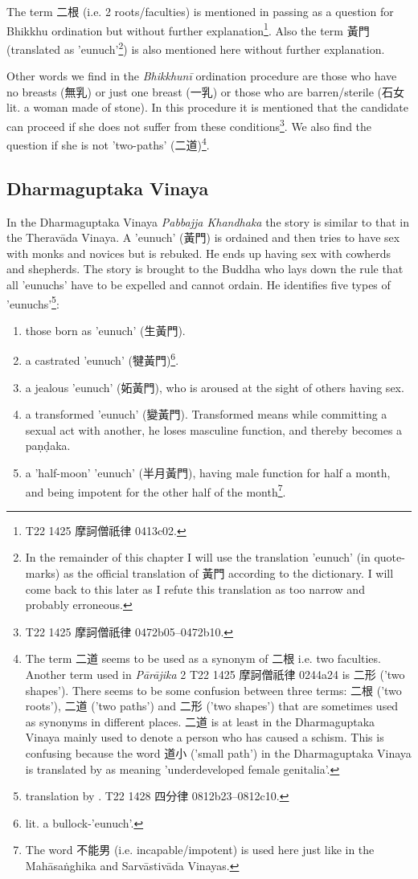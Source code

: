The term 二根 (i.e. 2 roots/faculties) is mentioned in passing as a question for Bhikkhu ordination but without further explanation\footnote{T22 1425 摩訶僧祇律 0413c02.}. Also the term 黃門 (translated as 'eunuch'\footnote{In the remainder of this chapter I will use the translation 'eunuch' (in quote-marks) as the official translation of 黃門 according to the dictionary. I will come back to this later as I refute this translation as too narrow and probably erroneous.}) is also mentioned here without further explanation.

Other words we find in the {\em Bhikkhunī} ordination procedure are those who have no breasts (無乳) or just one breast (一乳) or those who are barren/sterile (石女 lit. a woman made of stone). In this procedure it is mentioned that the candidate can proceed if she does not suffer from these conditions\footnote{T22 1425 摩訶僧祇律 0472b05–0472b10.}. We also find the question if she is not ’two-paths’ (二道)\footnote{The term 二道 seems to be used as a synonym of 二根 i.e. two faculties. Another term used in {\em Pārājika} 2 T22 1425 摩訶僧祇律 0244a24 is 二形 ('two shapes'). There seems to be some confusion between three terms: 二根 ('two roots'), 二道 ('two paths') and 二形 ('two shapes') that are sometimes used as synonyms in different places. 二道 is at least in the Dharmaguptaka Vinaya mainly used to denote a person who has caused a schism. This is confusing because the word 道小 ('small path') in the Dharmaguptaka Vinaya is translated by \cite{bodhi} as meaning 'underdeveloped female genitalia'.}.

\subsection{Dharmaguptaka Vinaya}
In the Dharmaguptaka Vinaya {\em Pabbajja Khandhaka} the story is similar to that in the Theravāda Vinaya. A 'eunuch' (黃門) is ordained and then tries to have sex with monks and novices but is rebuked. He ends up having sex with cowherds and shepherds. The story is brought to the Buddha who lays down the rule that all 'eunuchs' have to be expelled and cannot ordain. He identifies five types of 'eunuchs'\footnote{translation by \cite{bodhi}. T22 1428 四分律 0812b23–0812c10.}: 

\begin{enumerate}
\item those born as 'eunuch' (生黃門). 
\item a castrated 'eunuch' (犍黃門)\footnote{lit. a bullock-'eunuch'.}.
\item a jealous 'eunuch' (妬黃門), who is aroused at the sight of others having sex.
\item a transformed 'eunuch' (變黃門). Transformed means while committing a sexual act with another, he loses masculine function, and thereby becomes a paṇḍaka.
\item a 'half-moon' 'eunuch' (半月黃門), having male function for half a month, and being impotent for the other half of the month\footnote{The word 不能男 (i.e. incapable/impotent) is used here just like in the Mahāsaṅghika and Sarvāstivāda Vinayas.}.
\end{enumerate}

